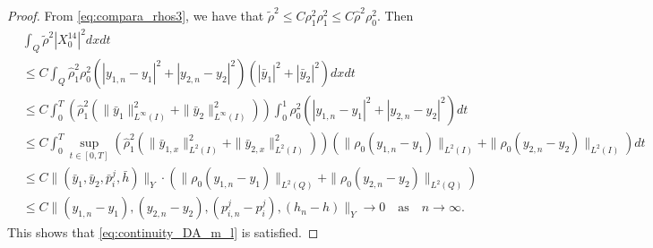 \documentclass[10pt,a4paper]{amsart}
\begin{document}
\begin{proof}
    \noindent From  \eqref{eq:compara_rhos3}, we have  that  $\tilde\rho^2\leq C \rho_1^2 \rho^2_1\leq C \hat{\rho}^2 \rho_0^2 $. Then
    \begin{equation*}
    \begin{split}
    	&\int_{Q} \tilde\rho^{2}|X_{0}^{14}|^{2} dxdt\\
        &\leq C \int_{Q} \hat{\rho}_1^2 \rho_0^2  ( |y_{1,n}-y_1|^2 + |y_{2,n}-y_2|^2 ) (|\bar y_1|^{2} + |\bar y_2|^{2} )dxdt\\
    	&\leq C \int_0^T \left(\hat{\rho}_1^2 (\| \bar{y}_1\|^2_{L^\infty(I)} + \| \bar{y}_2\|^2_{L^\infty(I)})\right)\int_{0}^{1} \rho_0^2  (|y_{1,n}-y_1|^2 + |y_{2,n}-y_2|^2 ) dt\\
        &\leq C \int_0^T \sup_{t\in [0,T]}\left(\hat{\rho}_1^2 (\| \bar{y}_{1,x}\|^2_{L^2(I)} + \| \bar{y}_{2,x}\|^2_{L^2(I)})\right) \left( \|\rho_0 (y_{1,n}-y_1)\|_{L^2(I)} + \|\rho_0 (y_{2,n}-y_2)\|_{L^2(I)} \right) dt\\
    	&\leq C\|(\bar y_1,\bar y_2,\bar p_i^j,\bar h)\|_{{Y}} \cdot \left( \|\rho_0 (y_{1,n}-y_1)\|_{L^2(Q)} + \|\rho_0 (y_{2,n}-y_2)\|_{L^2(Q)} \right)\\
    	&\leq C\|(y_{1,n}-y_1),(y_{2,n}-y_2),(p^{j}_{i,n}-p^{j}_i),(h_{n}-h)\|_{{Y}}\rightarrow 0 \quad\text{as}\quad n \to \infty.
    \end{split}
    \end{equation*}
    This shows that \eqref{eq:continuity_DA_m_l} is satisfied. 
\end{proof}
\end{document}
